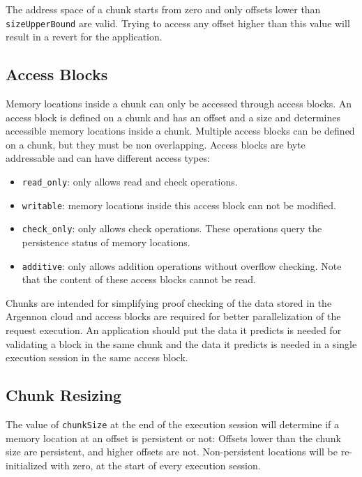The address space of a chunk starts from zero and only offsets lower than \texttt{sizeUpperBound} are valid. Trying to
access any offset higher than this value will result in a revert for the application.

\subsection{Access Blocks}\label{subsec:access-blocks}

Memory locations inside a chunk can only be accessed through access blocks. An access block is defined on a chunk
and has an offset and a size and determines accessible memory locations inside a chunk. Multiple access blocks can
be defined on a chunk, but they must be non overlapping. Access blocks are byte addressable and can have different
access types:

\begin{itemize}
    \item \texttt{read\_only}: only allows read and check operations.
    \item \texttt{writable}: memory locations inside this access block can not be modified.
    \item \texttt{check\_only}: only allows check operations. These operations query the persistence
    status of memory locations.
    \item \texttt{additive}: only allows addition operations without overflow checking. Note that the content of these
    access blocks cannot be read.
\end{itemize}

Chunks are intended for simplifying proof checking of the data stored in the Argennon cloud and access blocks are
required for better parallelization of the request execution. An application should put the data it predicts is
needed for validating a block in the same chunk and the data it predicts is needed in a single execution
session in the same access block.

\subsection{Chunk Resizing}\label{subsec:ch-resize}

The value of \texttt{chunkSize} at the end of the execution session will determine if a memory location at an
offset is persistent or not: Offsets lower than the chunk size are persistent, and higher offsets are not.
Non-persistent locations will be re-initialized with zero, at the start of every execution session.

